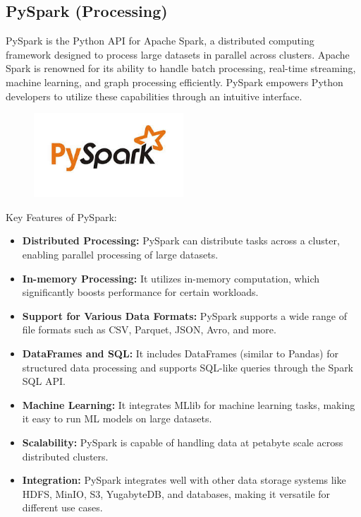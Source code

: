 \documentclass[12pt,a4paper]{article}
\begin{document}
\subsection{PySpark (Processing)}
PySpark is the Python API for Apache Spark, a distributed computing framework designed to process large datasets in parallel across clusters. Apache Spark is renowned for its ability to handle batch processing, real-time streaming, machine learning, and graph processing efficiently. PySpark empowers Python developers to utilize these capabilities through an intuitive interface.
\begin{figure}[H]
    \begin{center}
        \includegraphics[width=0.5\textwidth]{Images/pySpark.png}
    \end{center}
\end{figure}
Key Features of PySpark:
\begin{itemize}
    \item \textbf{Distributed Processing:} PySpark can distribute tasks across a
    cluster, enabling parallel processing of large datasets.
    \item \textbf{In-memory Processing:} It utilizes in-memory computation,
    which significantly boosts performance for certain workloads.
    \item \textbf{Support for Various Data Formats:} PySpark supports a wide
    range of file formats such as CSV, Parquet, JSON, Avro, and more.
    \item \textbf{DataFrames and SQL:} It includes DataFrames (similar to
    Pandas) for structured data processing and supports SQL-like queries through
    the Spark SQL API.
    \item \textbf{Machine Learning:} It integrates MLlib for machine learning
    tasks, making it easy to run ML models on large datasets.
    \item \textbf{Scalability:} PySpark is capable of handling data at petabyte
    scale across distributed clusters.
    \item \textbf{Integration:} PySpark integrates well with other data storage
    systems like HDFS, MinIO, S3, YugabyteDB, and databases, making it versatile
    for different use cases.
\end{itemize}
\end{document}
